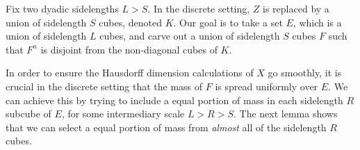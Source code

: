 \documentclass[usenames,dvipsnames]{article}
\theoremstyle{plain}
\theoremstyle{plain}
\begin{document}
Fix two dyadic sidelengths $L > S$. In the discrete setting, $Z$ is replaced by a union of sidelength $S$ cubes, denoted $K$. Our goal is to take a set $E$, which is a union of sidelength $L$ cubes, and carve out a union of sidelength $S$ cubes $F$ such that $F^n$ is disjoint from the non-diagonal cubes of $K$.

In order to ensure the Hausdorff dimension calculations of $X$ go smoothly, it is crucial in the discrete setting that the mass of $F$ is spread uniformly over $E$. We can achieve this by trying to include a equal portion of mass in each sidelength $R$ subcube of $E$, for some intermediary scale $L > R > S$. The next lemma shows that we can select a equal portion of mass from {\it almost} all of the sidelength $R$ cubes.

\begin{figure}[t]
	\centering
\end{figure}
\end{document}
